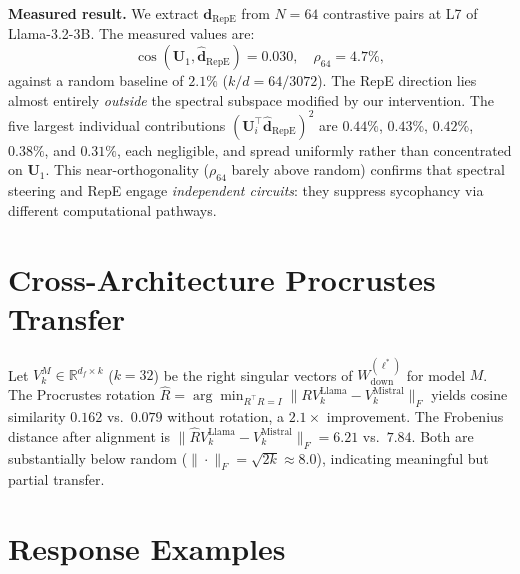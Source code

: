 \documentclass{article}
\begin{document}
\textbf{Measured result.}
We extract $\mathbf{d}_\mathrm{RepE}$ from $N{=}64$ contrastive pairs
at L7 of Llama-3.2-3B. The measured values are:
\[
  \cos(\mathbf{U}_1, \hat{\mathbf{d}}_\mathrm{RepE}) = 0.030, \quad
  \rho_{64} = 4.7\%,
\]
against a random baseline of $2.1\%$ ($k/d = 64/3072$).
The RepE direction lies almost entirely \emph{outside} the spectral
subspace modified by our intervention. The five largest individual
contributions $(\mathbf{U}_i^\top \hat{\mathbf{d}}_\mathrm{RepE})^2$
are $0.44\%$, $0.43\%$, $0.42\%$, $0.38\%$, and $0.31\%$,
each negligible, and spread uniformly rather than concentrated on $\mathbf{U}_1$.
This near-orthogonality ($\rho_{64}$ barely above random) confirms that
spectral steering and RepE engage \emph{independent circuits}:
they suppress sycophancy via different computational pathways.

\section{Cross-Architecture Procrustes Transfer}
\label{app:transfer}

Let $V_k^M\in\mathbb{R}^{d_f\times k}$ ($k{=}32$) be the right
singular vectors of $W_\mathrm{down}^{(\ell^{*})}$ for model $M$. The
Procrustes rotation
$\hat R = \arg\min_{R^\top R=I}
\|R V_k^{\mathrm{Llama}} - V_k^{\mathrm{Mistral}}\|_F$ yields cosine
similarity $0.162$ vs.\ $0.079$ without rotation, a $2.1\times$
improvement. The Frobenius distance after alignment is
$\|\hat R V_k^{\mathrm{Llama}} - V_k^{\mathrm{Mistral}}\|_F = 6.21$
vs.\ $7.84$. Both are substantially below random
($\|\cdot\|_F = \sqrt{2k} \approx 8.0$), indicating meaningful but
partial transfer.

\section{Response Examples}
\label{app:examples}
\end{document}
